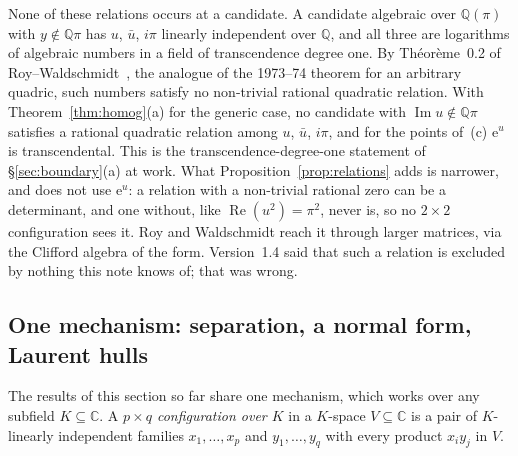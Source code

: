 \documentclass[11pt,a4paper]{article}
\theoremstyle{plain}
\theoremstyle{definition}
\newcommand{\C}{\mathbb{C}}
\newcommand{\e}{\mathrm{e}}
\newcommand{\Q}{\mathbb{Q}}
\begin{document}
None of these relations occurs at a candidate. A candidate algebraic over $\Q(\pi)$ with
$y\notin\Q\pi$ has $u$, $\bar u$, $i\pi$ linearly independent over $\Q$, and all three are
logarithms of algebraic numbers in a field of transcendence degree one. By Théorème~0.2 of
Roy--Waldschmidt~\cite{roy-waldschmidt-1997}, the analogue of the 1973--74 theorem for an arbitrary
quadric, such numbers satisfy no non-trivial rational quadratic relation. With
Theorem~\ref{thm:homog}(a) for the generic case, no candidate with $\operatorname{Im}u\notin\Q\pi$
satisfies a rational quadratic relation among $u$, $\bar u$, $i\pi$, and for the points of~(c)
$\e^{u}$ is transcendental. This is the transcendence-degree-one statement of
\S\ref{sec:boundary}(a) at work. What Proposition~\ref{prop:relations} adds is narrower, and does not
use $\e^{u}$: a relation with a non-trivial rational zero can be a determinant, and one without,
like $\operatorname{Re}(u^{2})=\pi^{2}$, never is, so no $2\times2$ configuration sees it.
Roy and Waldschmidt reach it through larger matrices, via the Clifford algebra of the form.
Version~1.4 said that such a relation is excluded by nothing this note knows of; that was wrong.

\subsection*{One mechanism: separation, a normal form, Laurent hulls}

The results of this section so far share one mechanism, which works over any subfield $K\subseteq\C$. A
\emph{$p\times q$ configuration over $K$} in a $K$-space $V\subseteq\C$ is a pair of $K$-linearly independent
families $x_{1},\dots,x_{p}$ and $y_{1},\dots,y_{q}$ with every product $x_{i}y_{j}$ in $V$.
\end{document}
